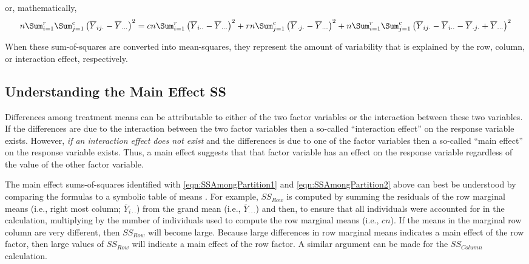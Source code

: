 \documentclass[10pt,openany]{book}\usepackage[]{graphicx}\usepackage[]{color}
\begin{document}
or, mathematically,
\begin{equation} \label{eqn:SSAmongPartition2}
  n\Sum_{i=1}^{r}\Sum_{j=1}^{c}\left(\overline{Y}_{ij\cdot}-\overline{Y}_{\cdot\cdot\cdot}\right)^{2} =
  cn\Sum_{i=1}^{r}\left(\overline{Y}_{i\cdot\cdot}-\overline{Y}_{\cdot\cdot\cdot}\right)^{2} +
  rn\Sum_{j=1}^{c}\left(\overline{Y}_{\cdot j\cdot}-\overline{Y}_{\cdot\cdot\cdot}\right)^{2} +
  n\Sum_{i=1}^{r}\Sum_{j=1}^{c}\left(\overline{Y}_{ij\cdot}-\overline{Y}_{i\cdot\cdot}-\overline{Y}_{\cdot j\cdot}+\overline{Y}_{\cdot\cdot\cdot}\right)^{2}
\end{equation}

When these sum-of-squares are converted into mean-squares, they represent the amount of variability that is explained by the row, column, or interaction effect, respectively.


\vspace{-12pt}


\subsection{Understanding the Main Effect SS}
Differences among treatment means can be attributable to either of the two factor variables or the interaction between these two variables.  If the differences are due to the interaction between the two factor variables then a so-called ``interaction effect'' on the response variable exists.  However, \emph{if an interaction effect does not exist} and the differences is due to one of the factor variables then a so-called ``main effect'' on the response variable exists.  Thus, a main effect suggests that that factor variable has an effect on the response variable regardless of the value of the other factor variable.

The main effect sums-of-squares identified with \eqref{eqn:SSAmongPartition1} and \eqref{eqn:SSAmongPartition2} above can best be understood by comparing the formulas to a symbolic table of means .  For example, $SS_{Row}$ is computed by summing the residuals of the row marginal means (i.e., right most column; $\overline{Y}_{i\cdot\cdot}$) from the grand mean (i.e., $\overline{Y}_{\cdot\cdot\cdot}$) and then, to ensure that all individuals were accounted for in the calculation, multiplying by the number of individuals used to compute the row marginal means (i.e., $cn$).  If the means in the marginal row column are very different, then $SS_{Row}$ will become large.  Because large differences in row marginal means indicates a main effect of the row factor, then large values of $SS_{Row}$ will indicate a main effect of the row factor.  A similar argument can be made for the $SS_{Column}$ calculation.
\end{document}
